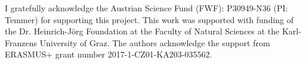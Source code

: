 
I gratefully acknowledge the Austrian Science Fund (FWF): P30949-N36 (PI: Temmer) for supporting this project. 
This work was supported with funding of the Dr. Heinrich-Jörg Foundation at the Faculty of Natural Sciences at the Karl-Franzens University of Graz.
The authors acknowledge the support from ERASMUS+ grant number 2017-1-CZ01-KA203-035562.